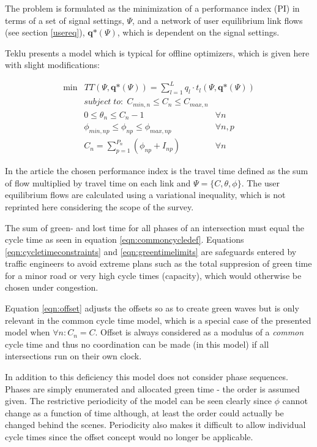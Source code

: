 The problem is formulated as the minimization of a performance index (PI) in terms of a set of signal settings, $\Psi$, and a network of user equilibrium link flows (see section \ref{usereq}), $\textbf{q*}(\Psi)$, which is dependent on the signal settings.

Teklu \cite{2} presents a model which is typical for offline optimizers, which is given here with slight modifications:

\begin{eqnarray}
\min & TT(\Psi, \textbf{q*}\left( \Psi\right)) = \displaystyle\sum_{l = 1}^{L} q_l \cdot t_l(\Psi,\textbf{q*}(\Psi))
\end{eqnarray}
\begin{eqnarray}
\label{eqn:cycletimeconstraints} subject\;to:\;C_{min,n} \leq C_n \leq C_{max,n} & \\
\label{eqn:offset} 0 \leq \theta_n \leq C_n-1 & \forall n \\
\label{eqn:greentimelimits} \phi_{min,np} \leq \phi_{np} \leq \phi_{max,np} & \forall n,p \\
\label{eqn:commoncycledef} C_n = \sum_{p=1}^{P_n} ( \phi_{np} + I_{np} ) & \forall n
\end{eqnarray}

In the article the chosen performance index is the travel time defined as the sum of flow multiplied by travel time on each link and $\Psi = \lbrace C,\theta,\phi \rbrace$. The user equilibrium flows are calculated using a variational inequality, which is not reprinted here considering the scope of the survey.

The sum of green- and lost time for all phases of an intersection must equal the cycle time as seen in equation \ref{eqn:commoncycledef}. Equations \ref{eqn:cycletimeconstraints} and \ref{eqn:greentimelimits} are safeguards entered by traffic engineers to avoid extreme plans such as the total suppresion of green time for a minor road or very high cycle times (capacity), which would otherwise be chosen under congestion.

Equation \ref{eqn:offset} adjusts the offsets so as to create green waves but is only relevant in the common cycle time model, which is a special case of the presented model when $\forall n : C_n = C$. Offset is always considered as a modulus of a \textit{common} cycle time and thus no coordination can be made (in this model) if all intersections run on their own clock.

In addition to this deficiency this model does not consider phase sequences. Phases are simply enumerated and allocated green time - the order is assumed given. The restrictive periodicity of the model can be seen clearly since $\phi$ cannot change as a function of time although, at least the order could actually be changed behind the scenes. Periodicity also makes it difficult to allow individual cycle times since the offset concept would no longer be applicable.

